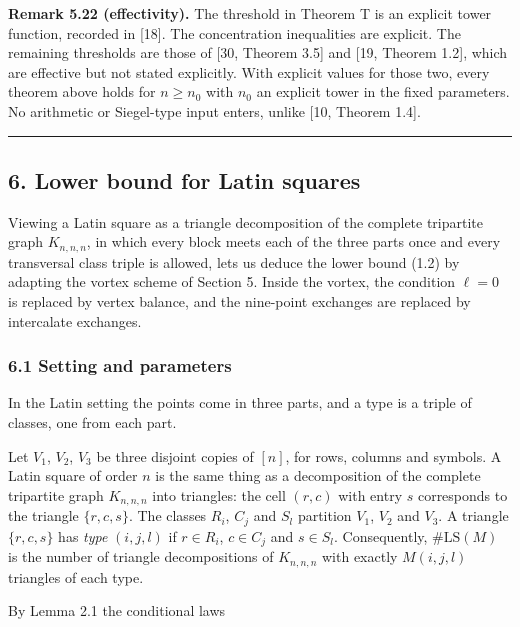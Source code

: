 \documentclass[english,11pt,a4paper]{article}
\begin{document}
\textbf{Remark 5.22 (effectivity).} The threshold in Theorem T is an explicit tower function, recorded in {[}18{]}. The concentration inequalities are explicit. The remaining thresholds are those of {[}30, Theorem 3.5{]} and {[}19, Theorem 1.2{]}, which are effective but not stated explicitly. With explicit values for those two, every theorem above holds for \(n\ge n_0\) with \(n_0\) an explicit tower in the fixed parameters. No arithmetic or Siegel-type input enters, unlike {[}10, Theorem 1.4{]}.

\begin{center}\rule{0.5\linewidth}{0.5pt}\end{center}

\subsection{6. Lower bound for Latin squares}\label{lower-bound-for-latin-squares}

Viewing a Latin square as a triangle decomposition of the complete tripartite graph \(K_{n,n,n}\), in which every block meets each of the three parts once and every transversal class triple is allowed, lets us deduce the lower bound (1.2) by adapting the vortex scheme of Section 5. Inside the vortex, the condition \(\ell=0\) is replaced by vertex balance, and the nine-point exchanges are replaced by intercalate exchanges.

\subsubsection{6.1 Setting and parameters}\label{setting-and-parameters}

In the Latin setting the points come in three parts, and a type is a triple of classes, one from each part.

Let \(V_1\), \(V_2\), \(V_3\) be three disjoint copies of \([n]\), for rows, columns and symbols. A Latin square of order \(n\) is the same thing as a decomposition of the complete tripartite graph \(K_{n,n,n}\) into triangles: the cell \((r,c)\) with entry \(s\) corresponds to the triangle \(\{r,c,s\}\). The classes \(R_i\), \(C_j\) and \(S_l\) partition \(V_1\), \(V_2\) and \(V_3\). A triangle \(\{r,c,s\}\) has \emph{type} \((i,j,l)\) if \(r\in R_i\), \(c\in C_j\) and \(s\in S_l\). Consequently, \(\#\mathrm{LS}(M)\) is the number of triangle decompositions of \(K_{n,n,n}\) with exactly \(M(i,j,l)\) triangles of each type.

By Lemma 2.1 the conditional laws
\end{document}
